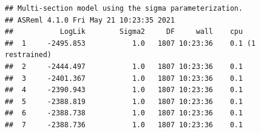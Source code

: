 \documentclass[
  12pt,
]{book}
\newenvironment{Shaded}{\begin{snugshade}}{\end{snugshade}}
\newcommand{\AttributeTok}[1]{\textcolor[rgb]{0.77,0.63,0.00}{#1}}
\newcommand{\DecValTok}[1]{\textcolor[rgb]{0.00,0.00,0.81}{#1}}
\newcommand{\FloatTok}[1]{\textcolor[rgb]{0.00,0.00,0.81}{#1}}
\newcommand{\FunctionTok}[1]{\textcolor[rgb]{0.00,0.00,0.00}{#1}}
\newcommand{\NormalTok}[1]{#1}
\newcommand{\OtherTok}[1]{\textcolor[rgb]{0.56,0.35,0.01}{#1}}
\newcommand{\SpecialCharTok}[1]{\textcolor[rgb]{0.00,0.00,0.00}{#1}}
\newcommand{\StringTok}[1]{\textcolor[rgb]{0.31,0.60,0.02}{#1}}
\begin{document}
\begin{Shaded}
\end{Shaded}

\begin{verbatim}
## Multi-section model using the sigma parameterization.
## ASReml 4.1.0 Fri May 21 10:23:35 2021
##           LogLik        Sigma2     DF     wall    cpu
##  1     -2495.853           1.0   1807 10:23:36    0.1 (1 restrained)
##  2     -2444.497           1.0   1807 10:23:36    0.1
##  3     -2401.367           1.0   1807 10:23:36    0.1
##  4     -2390.943           1.0   1807 10:23:36    0.1
##  5     -2388.819           1.0   1807 10:23:36    0.1
##  6     -2388.738           1.0   1807 10:23:36    0.1
##  7     -2388.736           1.0   1807 10:23:36    0.1
\end{verbatim}
\end{document}
